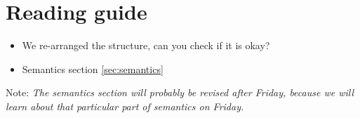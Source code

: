 \section{Reading guide}

\begin{itemize}
	\item We re-arranged the structure, can you check if it is okay?
	\item Semantics section \ref{sec:semantics}
\end{itemize}

Note: \textit{The semantics section will probably be revised after Friday, because we will learn about that particular part of semantics on Friday.}
